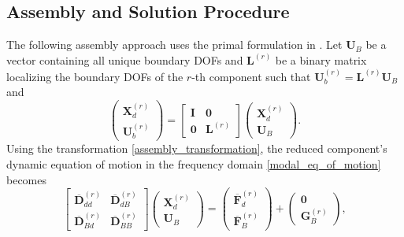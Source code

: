 %
%

\subsection{Assembly and Solution Procedure}
\label{ssec: solution}

The following assembly approach uses the primal formulation in \cite{de2008general}.
{Let $\mathbf{U}_{B}$ be a vector containing all unique boundary DOFs and $\mathbf{L}^{(r)}$ be a binary matrix localizing the boundary DOFs of the $r$-th component such that $\mathbf{U}_{b}^{(r)}=\mathbf{L}^{(r)}\mathbf{U}_{B}$ and}%
\begin{equation}
    \begin{pmatrix}
        \mathbf{X}_{d}^{(r)} \\
        \mathbf{U}_{b}^{(r)}
    \end{pmatrix}
    =
    \begin{bmatrix}
        \mathbf{I} & \mathbf{0} \\
        \mathbf{0} & \mathbf{L}^{(r)}
    \end{bmatrix}
    \begin{pmatrix}
        \mathbf{X}_{d}^{(r)} \\
        \mathbf{U}_{B}
    \end{pmatrix}.
    \label{assembly_transformation}
\end{equation}
{Using the transformation \eqref{assembly_transformation}, the reduced component's dynamic equation of motion in the frequency domain \eqref{modal_eq_of_motion} becomes}%
\begin{equation}
    \begin{bmatrix}
        \overline{\mathbf{D}}_{dd}^{(r)} &
        \overline{\mathbf{D}}_{dB}^{(r)} \\
        \overline{\mathbf{D}}_{Bd}^{(r)} &
        \overline{\mathbf{D}}_{BB}^{(r)}
    \end{bmatrix}
    \begin{pmatrix}
        \mathbf{X}_{d}^{(r)} \\
        \mathbf{U}_{B}
    \end{pmatrix}
    =
    \begin{pmatrix}
        \overline{\mathbf{F}}_{d}^{(r)} \\
        \overline{\mathbf{F}}_{B}^{(r)}
    \end{pmatrix}
    +
    \begin{pmatrix}
        \mathbf{0} \\
        \mathbf{G}_{B}^{(r)}
    \end{pmatrix},
    \label{semi_global_dynamic_equation}
\end{equation}
